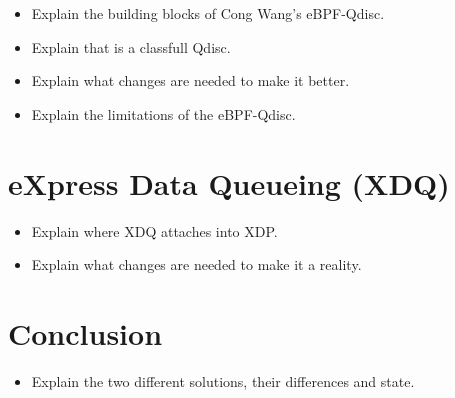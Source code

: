 \documentclass[sigconf, nonacm]{acmart}
\begin{document}
\begin{itemize}
  \item Explain the building blocks of Cong Wang's eBPF-Qdisc.
  \item Explain that is a classfull Qdisc.
  \item Explain what changes are needed to make it better.
  \item Explain the limitations of the eBPF-Qdisc.
\end{itemize}


\section{eXpress Data Queueing (XDQ)}

\begin{itemize}
  \item Explain where XDQ attaches into XDP.
  \item Explain what changes are needed to make it a reality.
\end{itemize}


\section{Conclusion}

\begin{itemize}
  \item Explain the two different solutions, their differences and state.
\end{itemize}





\end{document}
